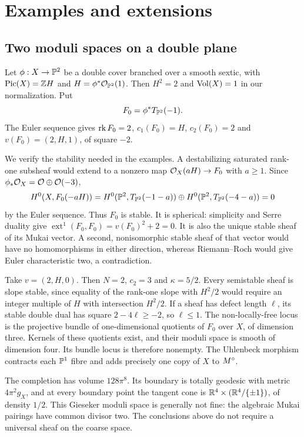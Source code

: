 \section{Examples and extensions}\label{sec:examples}

\subsection{Two moduli spaces on a double plane}
Let $\phi:X\to\mathbb P^2$ be a double cover branched over a smooth sextic, with
$\operatorname{Pic}(X)=\mathbb Z H$ and $H=\phi^*\mathcal O_{\mathbb P^2}(1)$.
Then $H^2=2$ and $\operatorname{Vol}(X)=1$ in our normalization. Put
\[
 F_0=\phi^*T_{\mathbb P^2}(-1).
\]
The Euler sequence gives $\operatorname{rk} F_0=2$, $c_1(F_0)=H$, $c_2(F_0)=2$ and
$v(F_0)=(2,H,1)$, of square $-2$.

We verify the stability needed in the examples. A destabilizing saturated
rank-one subsheaf would extend to a nonzero map $\mathcal O_X(aH)\to F_0$
with $a\ge1$. Since $\phi_*\mathcal O_X=\mathcal O\oplus\mathcal O(-3)$,
\[
 H^0(X,F_0(-aH))=
 H^0(\mathbb P^2,T_{\mathbb P^2}(-1-a))\oplus
 H^0(\mathbb P^2,T_{\mathbb P^2}(-4-a))=0
\]
by the Euler sequence. Thus $F_0$ is stable.
It is spherical: simplicity and Serre duality give
$\operatorname{ext}^1(F_0,F_0)=v(F_0)^2+2=0$.
It is also the unique stable sheaf of its Mukai vector. A second,
nonisomorphic stable sheaf of that vector would have no homomorphisms in
either direction, whereas Riemann--Roch would give Euler characteristic
two, a contradiction.

\begin{example}\label{ex:four}
Take $v=(2,H,0)$. Then $N=2$, $c_2=3$ and $\kappa=5/2$.
Every semistable sheaf is slope stable, since equality of the rank-one
slope with $H^2/2$ would require an integer multiple of $H$ with
intersection $H^2/2$.
If a sheaf has defect length $\ell$, its stable double dual has square
$2-4\ell\ge-2$, so $\ell\le1$.
The non-locally-free locus is the projective bundle of one-dimensional
quotients of $F_0$ over $X$, of dimension three. Kernels of these quotients
exist, and their moduli space is smooth of dimension four. Its bundle
locus is therefore nonempty. The Uhlenbeck morphism contracts each
$\mathbb P^1$ fibre and adds precisely one copy of $X$ to $M^{\circ}$.

The completion has volume $128\pi^8$. Its boundary is totally geodesic
with metric $4\pi^2g_X$, and at every boundary point the tangent cone is
$\mathbb R^4\times(\mathbb R^4/\{\pm1\})$, of density $1/2$.
This Gieseker moduli space is generally not fine: the algebraic Mukai
pairings have common divisor two. The conclusions above do not require
a universal sheaf on the coarse space.
\end{example}

